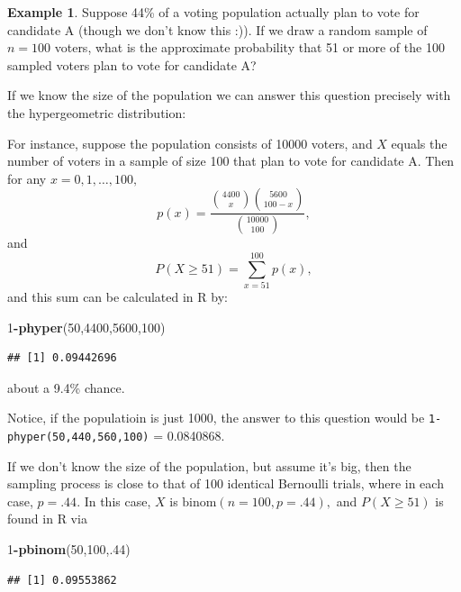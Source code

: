 \documentclass[
]{book}
\newenvironment{Shaded}{\begin{snugshade}}{\end{snugshade}}
\newcommand{\DecValTok}[1]{\textcolor[rgb]{0.00,0.00,0.81}{#1}}
\newcommand{\FunctionTok}[1]{\textcolor[rgb]{0.13,0.29,0.53}{\textbf{#1}}}
\newcommand{\NormalTok}[1]{#1}
\newcommand{\SpecialCharTok}[1]{\textcolor[rgb]{0.81,0.36,0.00}{\textbf{#1}}}
\theoremstyle{definition}
\theoremstyle{definition}
\newtheorem{example}{Example}[chapter]
\theoremstyle{definition}
\theoremstyle{definition}
\theoremstyle{remark}
\begin{document}
\begin{example}
Suppose 44\% of a voting population actually plan to vote for candidate A (though we don't know this :)). If we draw a random sample of \(n = 100\) voters, what is the approximate probability that 51 or more of the 100 sampled voters plan to vote for candidate A?

If we know the size of the population we can answer this question precisely with the hypergeometric distribution:

For instance, suppose the population consists of 10000 voters, and \(X\) equals the number of voters in a sample of size 100 that plan to vote for candidate A. Then for any \(x = 0, 1, \ldots, 100,\)
\[p(x) = \frac{\binom{4400}{x}\binom{5600}{100-x}}{\binom{10000}{100}},\]
and \[P(X \geq 51) = \sum_{x = 51}^{100} p(x),\]
and this sum can be calculated in R by:

\begin{Shaded}
\begin{Highlighting}[]
\DecValTok{1}\SpecialCharTok{{-}}\FunctionTok{phyper}\NormalTok{(}\DecValTok{50}\NormalTok{,}\DecValTok{4400}\NormalTok{,}\DecValTok{5600}\NormalTok{,}\DecValTok{100}\NormalTok{)}
\end{Highlighting}
\end{Shaded}

\begin{verbatim}
## [1] 0.09442696
\end{verbatim}

about a 9.4\% chance.

Notice, if the populatioin is just 1000, the answer to this question would be \texttt{1-phyper(50,440,560,100)} = 0.0840868.

If we don't know the size of the population, but assume it's big, then the sampling process is close to that of 100 identical Bernoulli trials, where in each case, \(p = .44\). In this case, \(X\) is \(\text{binom}(n=100,p=.44),\) and \(P(X \geq 51)\) is found in R via

\begin{Shaded}
\begin{Highlighting}[]
\DecValTok{1}\SpecialCharTok{{-}}\FunctionTok{pbinom}\NormalTok{(}\DecValTok{50}\NormalTok{,}\DecValTok{100}\NormalTok{,.}\DecValTok{44}\NormalTok{)}
\end{Highlighting}
\end{Shaded}

\begin{verbatim}
## [1] 0.09553862
\end{verbatim}


\end{example}
\end{document}
